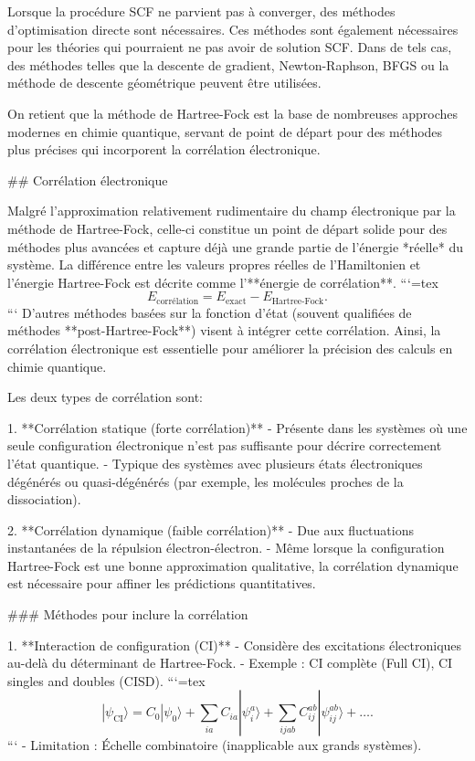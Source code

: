 \documentclass[12pt,a4paper]{report}
\numberwithin{equation}{section}
\numberwithin{figure}{section}
\numberwithin{table}{section}
\begin{document}
\begin{markdown}
Lorsque la procédure SCF ne parvient pas à converger, des méthodes d'optimisation directe sont nécessaires. Ces
méthodes sont également nécessaires pour les théories qui pourraient ne pas avoir de solution SCF. Dans de tels cas, des
méthodes telles que la descente de gradient, Newton-Raphson, BFGS ou la méthode de descente géométrique peuvent être utilisées.

On retient que la méthode de Hartree-Fock est la base de nombreuses approches modernes en chimie quantique, servant de point de départ pour des méthodes plus précises qui incorporent la corrélation électronique.

## Corrélation électronique

Malgré l'approximation relativement rudimentaire du champ électronique par la méthode de Hartree-Fock, celle-ci constitue un point de départ solide pour des méthodes plus avancées et capture déjà une grande partie de l’énergie *réelle* du système. La différence entre les valeurs propres réelles de l’Hamiltonien et l’énergie Hartree-Fock est décrite comme l’**énergie de corrélation**.
```{=tex}
\begin{equation}
E_{\text{corrélation}} = E_{\text{exact}} - E_{\text{Hartree-Fock}}.
\end{equation}
```
 D'autres méthodes basées sur la fonction d'état (souvent qualifiées de méthodes **post-Hartree-Fock**) visent à intégrer cette corrélation. Ainsi, la corrélation électronique est essentielle pour améliorer la précision des calculs en chimie quantique.
 
 Les deux types de corrélation sont:

1. **Corrélation statique (forte corrélation)**
   - Présente dans les systèmes où une seule configuration électronique n’est pas suffisante pour décrire correctement l’état quantique.
   - Typique des systèmes avec plusieurs états électroniques dégénérés ou quasi-dégénérés (par exemple, les molécules proches de la dissociation).

2. **Corrélation dynamique (faible corrélation)**
   - Due aux fluctuations instantanées de la répulsion électron-électron.
   - Même lorsque la configuration Hartree-Fock est une bonne approximation qualitative, la corrélation dynamique est nécessaire pour affiner les prédictions quantitatives.

### Méthodes pour inclure la corrélation

1. **Interaction de configuration (CI)**
   - Considère des excitations électroniques au-delà du déterminant de Hartree-Fock.
   - Exemple : CI complète (Full CI), CI singles and doubles (CISD).
```{=tex}
\begin{equation}
|\psi_{\text{CI}}\rangle = C_0 |\psi_0\rangle + \sum_{ia} C_{ia} |\psi_i^a\rangle + \sum_{ijab} C_{ij}^{ab} |\psi_{ij}^{ab}\rangle + \dots .
\end{equation}
```
   - Limitation : Échelle combinatoire (inapplicable aux grands systèmes).


\end{markdown}
\end{document}
